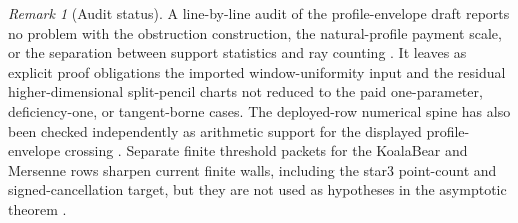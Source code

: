 \documentclass[11pt,a4paper]{amsart}
\numberwithin{equation}{section}
\theoremstyle{remark}
\newtheorem{remark}[theorem]{Remark}
\begin{document}
\begin{remark}[Audit status]\label{rem:audit-status}
A line-by-line audit of the profile-envelope draft reports no problem with
the obstruction construction, the natural-profile payment scale, or the
separation between support statistics and ray counting \cite{BuarProfileAudit}.
It leaves as explicit proof obligations the imported window-uniformity input
and the residual higher-dimensional split-pencil charts not reduced to the
paid one-parameter, deficiency-one, or tangent-borne cases.  The deployed-row
numerical spine has also been checked independently as arithmetic support for
the displayed profile-envelope crossing \cite{LegaProfileNumerics}.  Separate
finite threshold packets for the KoalaBear and Mersenne rows sharpen current
finite walls, including the star3 point-count and signed-cancellation target,
but they are not used as hypotheses in the asymptotic theorem
\cite{BuarStar3Packets}.
\end{remark}
\end{document}
